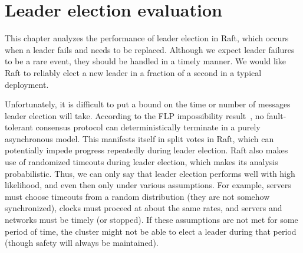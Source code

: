 \chapter{Leader election evaluation}
\label{leaderelection}

\newcommand\algo[1]{\emph{#1} algorithm}
\newcommand\algocap[1]{\emph{#1} algorithm}
\newcommand\algoabbrv[1]{\emph{#1} algo.}

This chapter analyzes the performance of leader election in Raft, which
occurs when a leader fails and needs to be
replaced. Although we expect leader failures to be a rare event, they
should be handled in a timely manner. We would like Raft to reliably
elect a new leader in a fraction of a second in a typical deployment.

Unfortunately, it is difficult to put a bound on the time or number of
messages leader election will take. According to the FLP impossibility
result~\cite{Fischer:1985}, no
fault-tolerant consensus protocol can deterministically terminate in a
purely asynchronous model. This manifests itself in split votes in Raft,
which can potentially impede progress repeatedly during leader election.
Raft also makes use of
randomized timeouts during leader election, which makes its analysis
probabilistic. Thus, we can only say that leader election
performs well with high likelihood, and even then only under various
assumptions. For example, servers must choose timeouts from a random
distribution (they are not somehow synchronized), clocks must proceed at
about the same rates, and servers and networks must be timely (or
stopped). If these assumptions are not met for some period of time, the
cluster might not be able to elect a leader during that period
(though safety will always be maintained).

